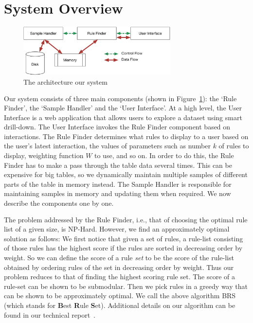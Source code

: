 
\section{System Overview}\label{sec:system}

\begin{figure}
\vspace{-5pt}
\centering
\includegraphics[width=80mm]{graphs/arch.pdf}
\vspace{-20pt}
\caption{The architecture our system \label{fig:system}}
\vspace{-15pt}
\end{figure}

Our system consists of three main components (shown in Figure~\ref{fig:system}): the `Rule Finder', the `Sample Handler' and the `User Interface'. 
At a high level, the User Interface is a web application that allows users to explore
a dataset using smart drill-down. The User Interface invokes the Rule Finder component based on interactions.
The Rule Finder determines what rules to display to a user based on the user's latest interaction, the values of parameters such as number $k$ of rules to display, weighting function $W$ to use, and so on. 
In order to do this, the Rule Finder has to make a pass through the table data several times. This can be expensive for big tables, so we dynamically maintain multiple samples of different parts of the table in memory instead. The Sample Handler is responsible for maintaining samples in memory and updating them when required. 
We now describe the components one by one.

 The problem addressed by the Rule Finder, i.e., that of choosing the optimal rule list of a given size, is NP-Hard. However, we find an approximately optimal solution as follows: We first notice that given a set of rules, a rule-list consisting of those rules has the highest score if the rules are sorted in decreasing order by weight. So we can define the score of a rule {\em set} to be the score of the rule-list obtained by ordering rules of the set in decreasing order by weight. Thus our problem reduces to that of finding the highest scoring rule set. The score of a rule-set can be shown to be submodular. Then we pick rules in a greedy way that can be shown to be approximately optimal. We call the above algorithm BRS (which stands for {\bf B}est {\bf R}ule {\bf S}et). Additional details on our algorithm can be found in our technical report~\cite{tr}. 

